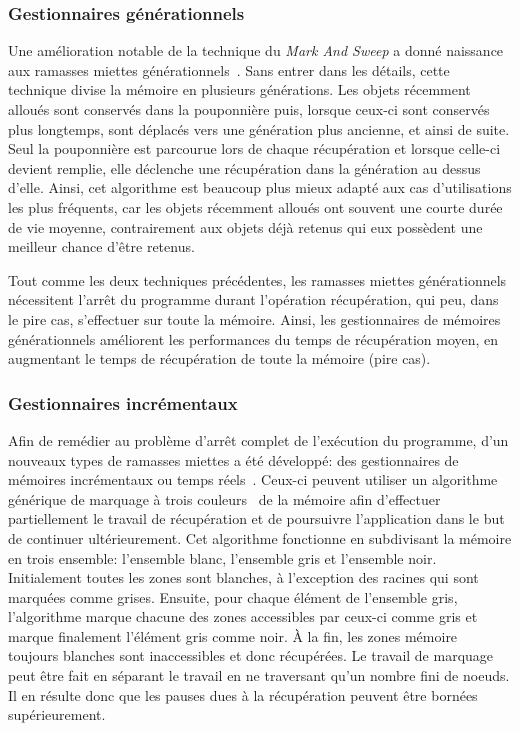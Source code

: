\documentclass[12pt,oneside,letterpaper,francais]{book}
\begin{document}
\subsubsection{Gestionnaires générationnels}
Une amélioration notable de la technique du \textit{Mark And Sweep} a
donné naissance aux ramasses miettes
générationnels~\cite{GEN_GC}. Sans entrer dans les détails, cette
technique divise la mémoire en plusieurs générations. Les objets
récemment alloués sont conservés dans la pouponnière puis, lorsque
ceux-ci sont conservés plus longtemps, sont déplacés vers une
génération plus ancienne, et ainsi de suite. Seul la pouponnière est
parcourue lors de chaque récupération et lorsque celle-ci devient
remplie, elle déclenche une récupération dans la génération au dessus
d'elle. Ainsi, cet algorithme est beaucoup plus mieux adapté aux cas
d'utilisations les plus fréquents, car les objets récemment alloués
ont souvent une courte durée de vie moyenne, contrairement aux objets
déjà retenus qui eux possèdent une meilleur chance d'être
retenus. 

Tout comme les deux techniques précédentes, les ramasses miettes
générationnels nécessitent l'arrêt du programme durant l'opération
récupération, qui peu, dans le pire cas, s'effectuer sur toute la
mémoire. Ainsi, les gestionnaires de mémoires générationnels
améliorent les performances du temps de récupération moyen, en
augmentant le temps de récupération de toute la mémoire (pire cas).

\subsubsection{Gestionnaires incrémentaux}
Afin de remédier au problème d'arrêt complet de l'exécution du
programme, d'un nouveaux types de ramasses miettes a été développé:
des gestionnaires de mémoires incrémentaux ou temps
réels~\cite{INCR_BAKER}. Ceux-ci peuvent utiliser un algorithme
générique de marquage à trois couleurs~\cite{dijkstra-tricolour} de la
mémoire afin d'effectuer partiellement le travail de récupération et
de poursuivre l'application dans le but de continuer
ultérieurement. Cet algorithme fonctionne en subdivisant la mémoire en
trois ensemble: l'ensemble blanc, l'ensemble gris et l'ensemble
noir. Initialement toutes les zones sont blanches, à l'exception des
racines qui sont marquées comme grises. Ensuite, pour chaque élément
de l'ensemble gris, l'algorithme marque chacune des zones accessibles
par ceux-ci comme gris et marque finalement l'élément gris comme
noir. À la fin, les zones mémoire toujours blanches sont inaccessibles
et donc récupérées.  Le travail de marquage peut être fait en séparant
le travail en ne traversant qu'un nombre fini de noeuds. Il en résulte
donc que les pauses dues à la récupération peuvent être bornées
supérieurement.
\end{document}
